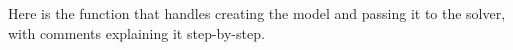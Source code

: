 \documentclass[12pt]{article}
\begin{document}
Here is the function that handles creating the model and passing it to the solver, with
comments explaining it step-by-step.
\newpage
\inputminted{python}{solver_listing.py}

\printbibliography[type={software},title={Libraries}]
\printbibliography[type={online}, title={References}]
\end{document}
